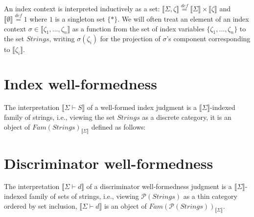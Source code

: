 \documentclass{article}
\newcommand{\sem}[1]{\llbracket #1 \rrbracket}
\newcommand{\defeq}{\overset{\mathit{def}}{=}}
\begin{document}
An index context is interpreted inductively as a set: $\sem{\Sigma,\zeta} \defeq \sem{\Sigma} \times \sem{\zeta}$ and $\sem{\emptyset} \defeq 1$ where $1$ is a singleton set $\{ \ast \}$. We will often treat an element of an index context $\sigma \in \sem{\zeta_1,\ldots,\zeta_n}$ as a function from the set of index variables $\{ \zeta_1, \ldots, \zeta_n \}$ to the set $\mathit{Strings}$, writing $\sigma(\zeta_i)$ for the projection of $\sigma$'s component corresponding to $\sem{\zeta_i}$. 

\section*{Index well-formedness}

The interpretation $\sem{\Sigma \vdash S}$ of a well-formed index judgment is a $\sem{\Sigma}$-indexed family of strings, i.e., viewing the set $\mathit{Strings}$ as a discrete category, it is an object of $\mathit{Fam}(\mathit{Strings})_{\sem{\Sigma}}$ defined as follows:

\section*{Discriminator well-formedness}


The interpretation $\sem{\Sigma \vdash d}$ of a discriminator well-formedness judgment is a $\sem{\Sigma}$-indexed family of sets of strings, i.e., viewing $\mathcal P(\mathit{Strings})$ as a thin category ordered by set inclusion, $\sem{\Sigma \vdash d}$ is an object of $\mathit{Fam}(\mathcal P(\mathit{Strings}))_{\sem{\Sigma}}$. 
\end{document}
